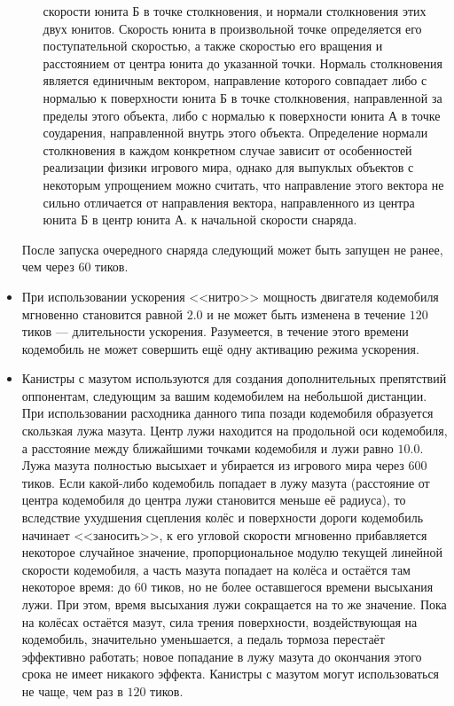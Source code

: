 \begin{itemize}
\begin{itemize}
{                скорости юнита Б в точке столкновения, и нормали столкновения этих двух юнитов. Скорость юнита в произвольной точке
                определяется его поступательной скоростью, а также скоростью его вращения и расстоянием от центра юнита до указанной точки.
                Нормаль столкновения является единичным вектором, направление которого совпадает либо с нормалью к поверхности юнита Б в
                точке столкновения, направленной за пределы этого объекта, либо с нормалью к поверхности юнита А в точке соударения,
                направленной внутрь этого объекта. Определение нормали столкновения в каждом конкретном случае зависит от особенностей
                реализации физики игрового мира, однако для выпуклых объектов с некоторым упрощением можно считать, что направление этого
                вектора не сильно отличается от направления вектора, направленного из центра юнита Б в центр юнита А.} к начальной скорости
                снаряда.
        \end{itemize}
        После запуска очередного снаряда следующий может быть запущен не ранее, чем через $60$ тиков.
  \item При использовании ускорения <<нитро>> мощность двигателя кодемобиля мгновенно становится равной $2.0$ и не может быть изменена в
        течение $120$ тиков --- длительности ускорения. Разумеется, в течение этого времени кодемобиль не может совершить ещё одну активацию
        режима ускорения.
  \item Канистры с мазутом используются для создания дополнительных препятствий оппонентам, следующим за вашим кодемобилем на небольшой
        дистанции. При использовании расходника данного типа позади кодемобиля образуется скользкая лужа мазута. Центр лужи находится на
        продольной оси кодемобиля, а расстояние между ближайшими точками кодемобиля и лужи равно $10.0$. Лужа мазута полностью высыхает и
        убирается из игрового мира через $600$ тиков. Если какой-либо кодемобиль попадает в лужу мазута (расстояние от центра кодемобиля до
        центра лужи становится меньше её радиуса), то вследствие ухудшения сцепления колёс и поверхности дороги кодемобиль начинает
        <<заносить>>, к его угловой скорости мгновенно прибавляется некоторое случайное значение, пропорциональное модулю текущей линейной
        скорости кодемобиля, а часть мазута попадает на колёса и остаётся там некоторое время: до $60$ тиков, но не более оставшегося
        времени высыхания лужи. При этом, время высыхания лужи сокращается на то же значение. Пока на колёсах остаётся мазут, сила трения
        поверхности, воздействующая на кодемобиль, значительно уменьшается, а педаль тормоза перестаёт эффективно работать; новое попадание
        в лужу мазута до окончания этого срока не имеет никакого эффекта. Канистры с мазутом могут использоваться не чаще, чем раз в $120$
        тиков.
\end{itemize}

